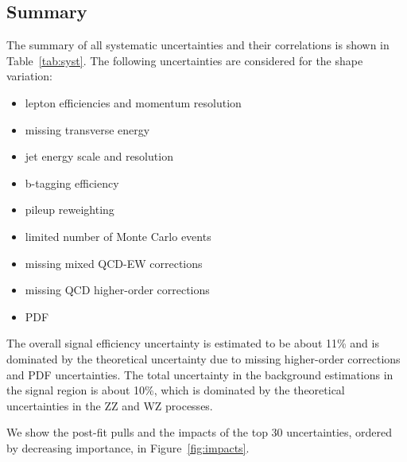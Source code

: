 \subsection{Summary}
\label{sec:syst_summary}

The summary of all systematic uncertainties and their correlations is shown in Table~\ref{tab:syst}.
The following uncertainties are considered for the shape variation:
\begin{itemize}
\item lepton efficiencies and momentum resolution 
\item missing transverse energy 
\item jet energy scale and resolution 
\item b-tagging efficiency 
\item pileup reweighting 
\item limited number of Monte Carlo events
\item missing mixed QCD-EW corrections
\item missing QCD higher-order corrections
\item PDF
\end{itemize}

The overall signal efficiency uncertainty is estimated to be about 11\%
and is dominated by the theoretical uncertainty due to missing
higher-order corrections and PDF uncertainties. The total uncertainty in the 
background estimations in the signal region is about 10\%, which is 
dominated by the theoretical uncertainties in the ZZ and WZ processes.

We show the post-fit pulls and the impacts of the top 30 uncertainties, ordered by decreasing importance,
in Figure~\ref{fig:impacts}.

